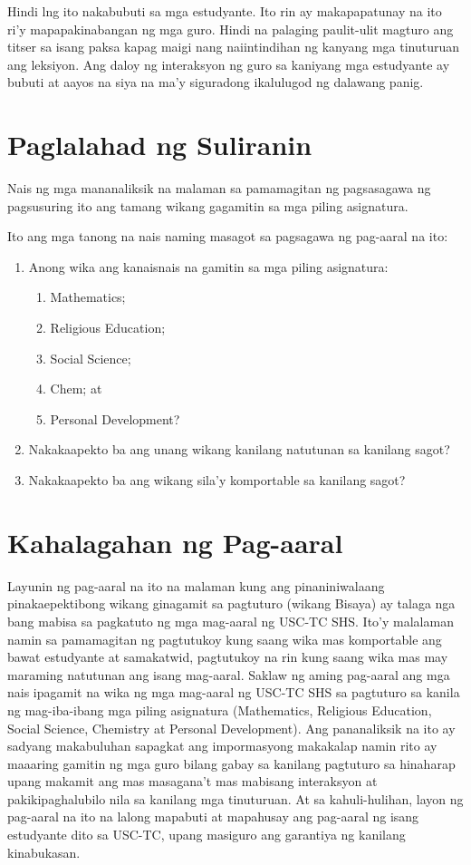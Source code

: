 \documentclass [11pt] {report}
\begin{document}
Hindi lng ito nakabubuti sa mga estudyante. Ito rin ay makapapatunay na ito ri’y
mapapakinabangan ng mga guro. Hindi na palaging paulit-ulit magturo ang titser
sa isang paksa kapag maigi nang naiintindihan ng kanyang mga tinuturuan ang
leksiyon. Ang daloy ng interaksyon ng guro sa kaniyang mga estudyante ay bubuti
at aayos na siya na ma'y siguradong ikalulugod ng dalawang panig.
\pagebreak
\section {Paglalahad ng Suliranin}
Nais ng mga mananaliksik na malaman sa pamamagitan ng pagsasagawa ng pagsusuring
ito ang tamang wikang gagamitin sa mga piling asignatura.

Ito ang mga tanong na nais naming masagot sa pagsagawa ng pag-aaral na ito:

\begin{enumerate}[parsep=\baselineskip,itemsep=-0.5\baselineskip]
\item Anong wika ang kanaisnais na gamitin sa mga piling asignatura:
  \begin{enumerate}[nosep]
  \item Mathematics;
  \item Religious Education;
  \item Social Science;
  \item Chem; at
  \item Personal Development?
  \end{enumerate}
\item Nakakaapekto ba ang unang wikang kanilang natutunan sa kanilang sagot?
\item Nakakaapekto ba ang wikang sila'y komportable sa kanilang sagot?
\end{enumerate}

\section{Kahalagahan ng Pag-aaral}
Layunin ng pag-aaral na ito na malaman kung ang pinaniniwalaang pinakaepektibong
wikang ginagamit sa pagtuturo (wikang Bisaya) ay talaga nga bang mabisa sa
pagkatuto ng mga mag-aaral ng USC-TC SHS. Ito’y malalaman namin sa pamamagitan
ng pagtutukoy kung saang wika mas komportable ang bawat estudyante at
samakatwid, pagtutukoy na rin kung saang wika mas may maraming natutunan ang
isang mag-aaral. Saklaw ng aming pag-aaral ang mga nais ipagamit na wika ng mga
mag-aaral ng USC-TC SHS sa pagtuturo sa kanila ng mag-iba-ibang mga piling
asignatura (Mathematics, Religious Education, Social Science, Chemistry at
Personal Development). Ang pananaliksik na ito ay sadyang makabuluhan sapagkat
ang impormasyong makakalap namin rito ay maaaring gamitin ng mga guro bilang
gabay sa kanilang pagtuturo sa hinaharap upang makamit ang mas masagana’t mas
mabisang interaksyon at pakikipaghalubilo nila sa kanilang mga tinuturuan. At sa
kahuli-hulihan, layon ng pag-aaral na ito na lalong mapabuti at mapahusay ang
pag-aaral ng isang estudyante dito sa USC-TC, upang masiguro ang garantiya ng
kanilang kinabukasan.
\end{document}
